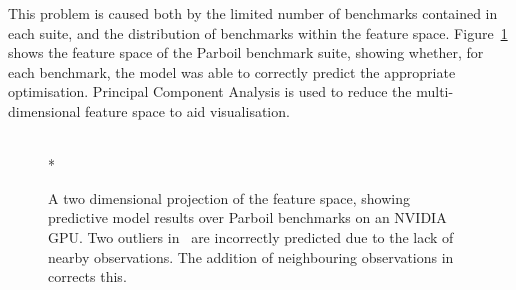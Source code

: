This problem is caused both by the limited number of benchmarks contained in each suite, and the distribution of benchmarks within the feature space. Figure~\ref{fig:pca-benchmarks} shows the feature space of the Parboil benchmark suite, showing whether, for each benchmark, the model was able to correctly predict the appropriate optimisation. Principal Component Analysis is used to reduce the multi-dimensional feature space to aid visualisation.

\begin{figure}
  \centering
  \\*
  \caption[Identifying and correcting outliers in a benchmark suite]{%
    A two dimensional projection of the \citeauthor{Grewe2013} feature space, showing predictive model results over Parboil benchmarks on an NVIDIA GPU. Two outliers in~\protect{} are incorrectly predicted due to the lack of nearby observations. The addition of neighbouring observations in~\protect{} corrects this.%
  }%
  \label{fig:pca-benchmarks}
\end{figure}

